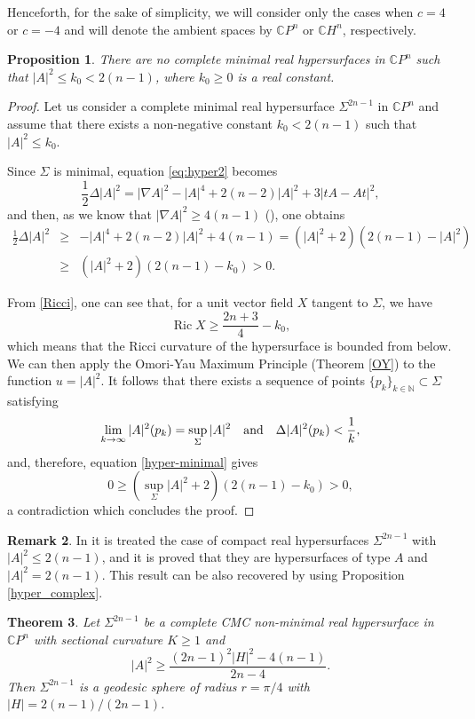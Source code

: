 \documentclass[11pt]{amsart}
\theoremstyle{plain}
\newtheorem{theorem}                {Theorem}      [section]
\newtheorem{proposition}  [theorem]  {Proposition}
\theoremstyle{definition}
\newtheorem{remark}       [theorem]  {Remark}
\DeclareMathOperator{\ric}{Ric}
\numberwithin{equation}{section}
\begin{document}
Henceforth, for the sake of simplicity, we will consider only the cases when $c=4$ or $c=-4$ and will denote the ambient spaces by $\mathbb{C}P^n$ or $\mathbb{C}H^n$, respectively.

\begin{proposition} There are no complete minimal real hypersurfaces in $\mathbb{C}P^n$ such that $|A|^2\leq k_0<2(n-1)$, where $k_0\geq 0$ is a real constant.
\end{proposition}

\begin{proof} Let us consider a complete minimal real hypersurface $\Sigma^{2n-1}$ in $\mathbb{C}P^n$ and assume that there exists a non-negative constant $k_0<2(n-1)$ such that $|A|^2\leq k_0$. 

Since $\Sigma$ is minimal, equation \eqref{eq:hyper2} becomes
$$
\frac{1}{2}\Delta |A|^2=|\nabla A|^2-|A|^4+2(n-2)|A|^2+3|tA-At|^2,
$$
and then, as we know that $|\nabla A|^2\geq 4(n-1)$ (\cite[Theorem 1.11]{NR}), one obtains
\begin{eqnarray}\label{hyper-minimal}
\frac{1}{2}\Delta |A|^2&\geq&-|A|^4+2(n-2)|A|^2+4(n-1)=(|A|^2+2)(2(n-1)-|A|^2)\\\nonumber&\geq& (|A|^2+2)(2(n-1)-k_0)>0.
\end{eqnarray}

From \eqref{Ricci}, one can see that, for a unit vector field $X$ tangent to $\Sigma$, we have
$$
\ric X\geq\frac{2n+3}{4}-k_0,
$$
which means that the Ricci curvature of the hypersurface is bounded from below. We can then apply the Omori-Yau Maximum Principle (Theorem \ref{OY}) to the function $u=|A|^2$. It follows that there exists a sequence of points $\{p_k\}_{k\in\mathbb{N}}\subset\Sigma$ satisfying
$$
\lim_{k\rightarrow\infty}|A|^2(p_k)=\sup_{\Sigma}|A|^2\quad\textnormal{and}\quad\Delta |A|^2(p_k)<\frac{1}{k},
$$
and, therefore, equation \eqref{hyper-minimal} gives
$$
0\geq(\sup_{\Sigma}|A|^2+2)(2(n-1)-k_0)>0,
$$
a contradiction which concludes the proof.
\end{proof}

\begin{remark} In \cite[Theorem 2]{L} it is treated the case of compact real hypersurfaces $\Sigma^{2n-1}$ with $|A|^2\leq 2(n-1)$, and it is proved that they are hypersurfaces of type $A$ and $|A|^2=2(n-1)$. This result can be also recovered by using Proposition \ref{hyper_complex}.
\end{remark}

\begin{theorem}\label{thm_cmc} Let $\Sigma^{2n-1}$ be a complete CMC non-minimal real hypersurface in $\mathbb{C}P^n$ with sectional curvature $K\geq 1$ and
$$
|A|^2\geq\frac{(2n-1)^2|H|^2-4(n-1)}{2n-4}.
$$
Then $\Sigma^{2n-1}$ is a geodesic sphere of radius $r=\pi/4$ with $|H|=2(n-1)/(2n-1)$.
\end{theorem}
\end{document}

